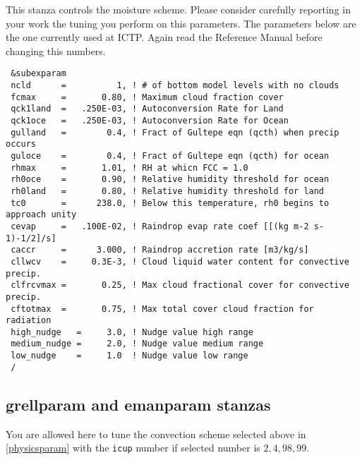 This stanza controls the moisture scheme. Please consider carefully reporting
in your work the tuning you perform on this parameters. The parameters below
are the one currently used at ICTP. Again read the Reference Manual before
changing this numbers.

{\footnotesize
\begin{Verbatim}
 &subexparam
 ncld      =          1, ! # of bottom model levels with no clouds
 fcmax     =       0.80, ! Maximum cloud fraction cover
 qck1land  =   .250E-03, ! Autoconversion Rate for Land
 qck1oce   =   .250E-03, ! Autoconversion Rate for Ocean
 gulland   =        0.4, ! Fract of Gultepe eqn (qcth) when precip occurs
 guloce    =        0.4, ! Fract of Gultepe eqn (qcth) for ocean
 rhmax     =       1.01, ! RH at whicn FCC = 1.0
 rh0oce    =       0.90, ! Relative humidity threshold for ocean
 rh0land   =       0.80, ! Relative humidity threshold for land
 tc0       =      238.0, ! Below this temperature, rh0 begins to approach unity
 cevap     =   .100E-02, ! Raindrop evap rate coef [[(kg m-2 s-1)-1/2]/s]
 caccr     =      3.000, ! Raindrop accretion rate [m3/kg/s]
 cllwcv    =     0.3E-3, ! Cloud liquid water content for convective precip.
 clfrcvmax =       0.25, ! Max cloud fractional cover for convective precip.
 cftotmax  =       0.75, ! Max total cover cloud fraction for radiation
 high_nudge   =     3.0, ! Nudge value high range
 medium_nudge =     2.0, ! Nudge value medium range
 low_nudge    =     1.0  ! Nudge value low range
 /
\end{Verbatim}
}

\subsection{grellparam and emanparam stanzas}

You are allowed here to tune the convection scheme selected above in
\ref{physicsparam} with the \verb=icup= number if selected number is
$2, 4, 98, 99$. 


